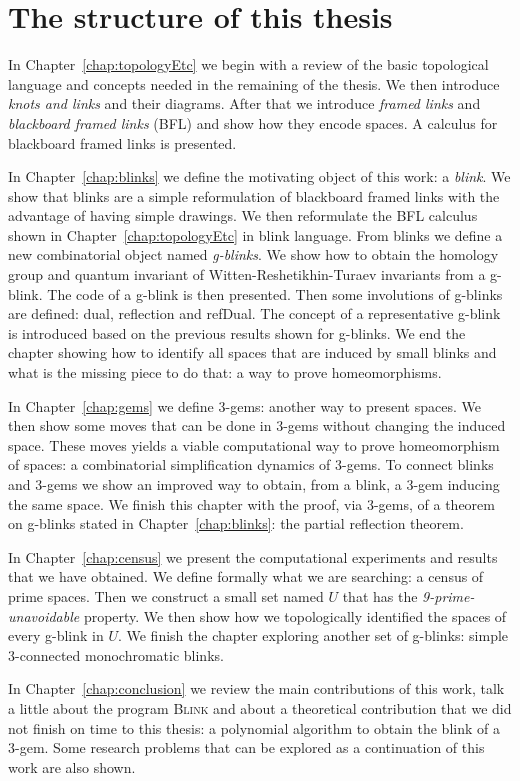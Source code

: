 \section{The structure of this thesis}

In Chapter~\ref{chap:topologyEtc} we begin with a
review of the basic topological language and concepts needed in the remaining of
the thesis. We then introduce {\it knots and links} and their diagrams.
After that we introduce {\it framed links} and
{\it blackboard framed links} (BFL) and show how they encode spaces.
A calculus for blackboard framed links is presented.

In Chapter~\ref{chap:blinks} we define the motivating object of this
work: a {\it blink}. We show that blinks are a simple
reformulation of blackboard framed links with the advantage of having
simple drawings. We then reformulate the BFL calculus shown in
Chapter~\ref{chap:topologyEtc} in blink language. From
blinks we define a new combinatorial object named {\it g-blinks}. We show
how to obtain the homology group and quantum invariant of
Witten-Reshetikhin-Turaev invariants from a g-blink. The code
of a g-blink is then presented. Then some involutions
of g-blinks are defined: dual, reflection and refDual. The concept
of a representative g-blink is introduced based on the previous
results shown for g-blinks. We end the chapter showing how to
identify all spaces that are induced by small blinks and what
is the missing piece to do that: a way to prove homeomorphisms.

In Chapter~\ref{chap:gems} we define 3-gems: another way to present
spaces. We then show some moves that can be done in
3-gems without changing the induced space. These moves yields a
viable computational way to prove homeomorphism of spaces: a
combinatorial simplification dynamics of 3-gems. To connect blinks
and 3-gems we show an improved way to obtain, from a blink,
a 3-gem inducing the same space. We finish this chapter with the
proof, via 3-gems, of a theorem on g-blinks stated in
Chapter~\ref{chap:blinks}: the partial reflection theorem.

In Chapter~\ref{chap:census} we present the computational
experiments and results that we have obtained. We define formally
what we are searching: a census of prime spaces. Then we construct
a small set named $U$ that has the {\it 9-prime-unavoidable} property.
We then show how we topologically identified the spaces of every
g-blink in $U$. We finish the chapter exploring another set of
g-blinks: simple 3-connected monochromatic blinks.

In Chapter~\ref{chap:conclusion} we review the main contributions
of this work, talk a little about the program \textsc{Blink} and
about a theoretical contribution that we did not finish on
time to this thesis: a polynomial algorithm to obtain the blink
of a 3-gem. Some research problems that can be explored as a
continuation of this work are also shown.







